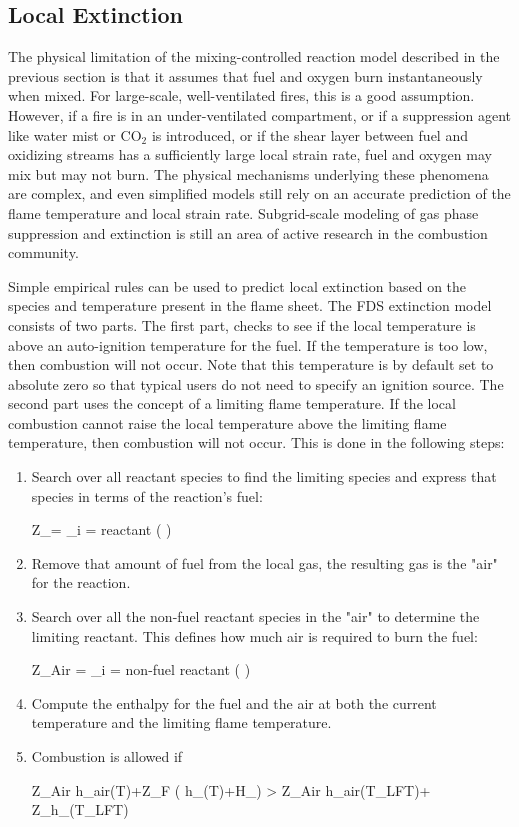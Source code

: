 \subsection{Local Extinction}

\label{extinction}

The physical limitation of the mixing-controlled reaction model described in the previous section is that it assumes that fuel and oxygen burn instantaneously when mixed. For large-scale, well-ventilated
fires, this is a good assumption. However, if a fire is in an
under-ventilated compartment, or if a suppression agent like water
mist or CO$_2$ is introduced, or if the shear layer between fuel and oxidizing streams
has a sufficiently large local strain rate,
fuel and oxygen may mix but may not burn.
The physical mechanisms underlying these phenomena are complex, and
even simplified models still rely on an accurate prediction
of the flame temperature and local strain rate.
Subgrid-scale modeling of gas phase suppression and
extinction is still an area of active research in the combustion
community.

Simple empirical rules can be used to predict local
extinction based on the species and temperature present in the flame sheet.  The FDS extinction model consists of two parts. The first part, checks to see if the local temperature is above an auto-ignition temperature for the fuel.  If the temperature is too low, then combustion will not occur.  Note that this temperature is by default set to absolute zero so that typical users do not need to specify an ignition source.  The second part uses the concept of a limiting flame temperature.  If the local combustion cannot raise the local temperature above the limiting flame temperature, then combustion will not occur.  This is done in the following steps:

\begin{enumerate}
\item Search over all reactant species to find the limiting species and express that species in terms of the reaction's fuel:

\be \Delta Z_\F = \min_{i \; = \; reactant} \left( \right) \ee
\item Remove that amount of fuel from the local gas, the resulting gas is the "air" for the reaction.
\item Search over all the non-fuel reactant species in the "air" to determine the limiting reactant.  This defines how much air is required to burn the fuel:

\be \Delta Z_{Air} = \min_{i \; = \; non-fuel \; reactant} \left( \right) \ee

\item Compute the enthalpy for the fuel and the air at both the current temperature and the limiting flame temperature.
\item Combustion is allowed if 

\be \Delta Z_{Air} h_{air}(T)+\Delta Z_F \left( h_\F(T)+\Delta H_\F \right) > \Delta Z_{Air} h_{air}(T_{LFT})+ \Delta Z_\F h_\F(T_{LFT}) \ee

\end{enumerate}


